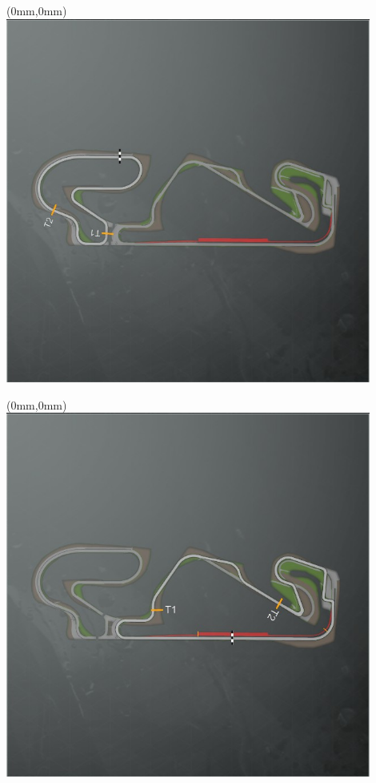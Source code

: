 \null\newpage
\begin{textblock*}{30mm}(0mm,0mm)%
\includegraphics[width=120mm]{TR/2015-05-20_00020.png}
\end{textblock*}
\null\newpage
\begin{textblock*}{30mm}(0mm,0mm)%
\includegraphics[width=120mm]{TR/2015-05-20_00019.png}
\end{textblock*}
